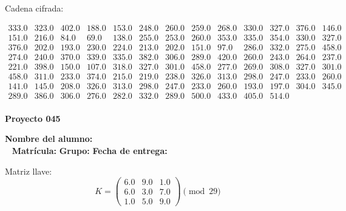 \documentclass[12pt]{article}
\begin{document}
Cadena cifrada:
\begin{center}
$\begin{array}{lllllllllllll}
333.0 & 323.0 & 402.0 & 188.0 & 153.0 & 248.0 & 260.0 & 259.0 & 268.0 & 330.0 & 327.0 & 376.0 & 146.0\\
151.0 & 216.0 & 84.0 & 69.0 & 138.0 & 255.0 & 253.0 & 260.0 & 353.0 & 335.0 & 354.0 & 330.0 & 327.0\\
376.0 & 202.0 & 193.0 & 230.0 & 224.0 & 213.0 & 202.0 & 151.0 & 97.0 & 286.0 & 332.0 & 275.0 & 458.0\\
274.0 & 240.0 & 370.0 & 339.0 & 335.0 & 382.0 & 306.0 & 289.0 & 420.0 & 260.0 & 243.0 & 264.0 & 237.0\\
221.0 & 398.0 & 150.0 & 107.0 & 318.0 & 327.0 & 301.0 & 458.0 & 277.0 & 269.0 & 308.0 & 327.0 & 301.0\\
458.0 & 311.0 & 233.0 & 374.0 & 215.0 & 219.0 & 238.0 & 326.0 & 313.0 & 298.0 & 247.0 & 233.0 & 260.0\\
141.0 & 145.0 & 208.0 & 326.0 & 313.0 & 298.0 & 247.0 & 233.0 & 260.0 & 193.0 & 197.0 & 304.0 & 345.0\\
289.0 & 386.0 & 306.0 & 276.0 & 282.0 & 332.0 & 289.0 & 500.0 & 433.0 & 405.0 & 514.0\\
\end{array}$
\end{center}

\newpage


\textbf{Proyecto 045}

\textbf{Nombre del alumno:} \underline{\hspace{13cm}}\\\
\vspace{1cm}
\textbf{Matrícula:} \underline{\hspace{4cm}} \hspace{1cm}
\textbf{Grupo:} \underline{\hspace{2cm}}
\textbf{Fecha de entrega:} \underline{\hspace{2cm}}

\medskip

Matriz llave:
\[
K = \begin{pmatrix}
6.0 & 9.0 & 1.0\\
6.0 & 3.0 & 7.0\\
1.0 & 5.0 & 9.0
\end{pmatrix} \pmod{29}
\]
\end{document}

